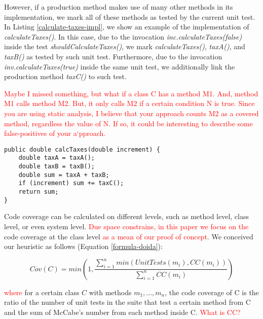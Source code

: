 \documentclass{sig-alternate}
\begin{document}
However, if a production method makes use of many other methods in its implementation,
we mark all of these methods as tested by the current unit test. In Listing \ref{calculate-taxes-impl},
we show an example of the implementation of \textit{calculateTaxes()}. In this case, due to the 
invocation \textit{inc.calculateTaxes(false)} inside the test \textit{shouldCalculateTaxes()}, 
we mark \textit{calculateTaxes()}, \textit{taxA()}, and \textit{taxB()} as tested 
by such unit test. Furthermore, due to the invocation \textit{inv.calculateTaxes(true)} inside
the same unit test, we additionally link the production method \textit{taxC()} to such test.

\textcolor{red}{Maybe I missed something, but what if a class C has a method M1. And, method M1 calls method M2. But, it only calls M2 if a certain condition N is true. Since you are using static analysis, I believe that your approach counts M2 as a covered method, regardless the value of N. If so, it could be interesting to describe some false-positives of your a`pproach.}

\begin{lstlisting}
public double calcTaxes(double increment) {
	double taxA = taxA();
	double taxB = taxB();
	double sum = taxA + taxB;
	if (increment) sum += taxC();
	return sum;
}
\end{lstlisting}

Code coverage can be calculated on different levels, such as method level, class level, or even
system level.  \textcolor{red}{Due space constrains, in this paper we focus on the} code coverage at the class level \textcolor{red}{as a mean of our proof of concept}.
 We conceived our heuristic as follows (Equation \ref{formula-doida}):

\begin{equation}
\label{formula-doida}
Cov(C) = min(1,\frac{\sum_{i=1}^{n}min(UnitTests(m_i), CC(m_i))}{\sum_{i=1}^{n}{CC(m_i)}})
\end{equation}

\textcolor{red}{where} for a certain class $C$ with methods $m_1, ..., m_n$, 
the code coverage of C is the ratio of the number of unit tests in the suite that test a certain method from C and 
the sum of McCabe's number from each method inside C. \textcolor{red}{What is CC?}
\end{document}
